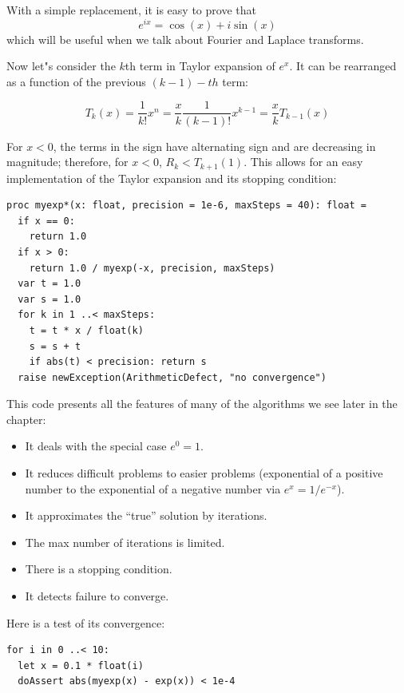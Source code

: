 \documentclass[justified, sixbynine]{tufte-book}
\def\ft{\small\tt}
\theoremstyle{plain}%
\newtheorem * {corollary}{Corollary}
\theoremstyle{definition}
\theoremstyle{remark}
\newtheorem * {remark}{Remark}
\newtheorem * {note}{Note}
\begin{document}
\begin{fullwidth}
With a simple replacement, it is easy to prove that
\begin{equation}
e^{ix} = \cos(x) + i \sin(x)
\end{equation}
which will be useful when we talk about Fourier and Laplace transforms.

Now let"s consider the $k$th term in Taylor expansion of $e^x$. It can be rearranged as a function of the previous $(k-1)-th$ term:

\begin{equation}
T_k(x) = \frac1{k!}x^n = \frac{x}{k} \frac1{(k-1)!}x^{k-1} = \frac{x}{k} T_{k-1}(x)
\end{equation}

For $x<0$, the terms in the sign have alternating sign and are decreasing in magnitude; therefore, for $x<0$, $R_k<T_{k+1}(1)$. This allows for an easy implementation of the Taylor expansion and its stopping condition:

\begin{lstlisting}[caption={in file: {\ft nlib/taylor.nim}}]
proc myexp*(x: float, precision = 1e-6, maxSteps = 40): float =
  if x == 0:
    return 1.0
  if x > 0:
    return 1.0 / myexp(-x, precision, maxSteps)
  var t = 1.0
  var s = 1.0
  for k in 1 ..< maxSteps:
    t = t * x / float(k)
    s = s + t
    if abs(t) < precision: return s
  raise newException(ArithmeticDefect, "no convergence")
\end{lstlisting}

This code presents all the features of many of the algorithms we see later in the chapter:
\begin{itemize}
\item It deals with the special case $e^0=1$.
\item It reduces difficult problems to easier problems (exponential of a positive number to the exponential of a negative number via $e^x = 1/e^{-x}$).
\item It approximates the ``true'' solution by iterations.
\item The max number of iterations is limited.
\item There is a stopping condition.
\item It detects failure to converge.
\end{itemize}

Here is a test of its convergence:

\begin{lstlisting}
for i in 0 ..< 10:
  let x = 0.1 * float(i)
  doAssert abs(myexp(x) - exp(x)) < 1e-4
\end{lstlisting}


\end{fullwidth}
\end{document}
